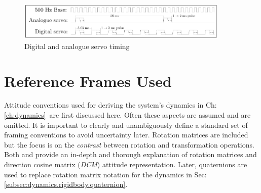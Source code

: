 \begin{figure}
\centering
\includegraphics[width=0.9\textwidth]{figs/servo-timing}
\caption{Digital and analogue servo timing}
\label{fig:servo-timing}
\vspace{-20pt}
\end{figure}
\section{Reference Frames Used}
\label{sec:proto.conventions}
Attitude conventions used for deriving the system's dynamics in Ch:\ref{ch:dynamics}~are first discussed here. Often these aspects are assumed and are omitted. It is important to clearly and unambiguously define a standard set of framing conventions to avoid uncertainty later. Rotation matrices are included but the focus is on the \emph{contrast} between rotation and transformation operations. Both \cite{spacecraftattitutdequaternions} and \cite{rigidbodylecture} provide an in-depth and thorough explanation of rotation matrices and direction cosine matrix (\emph{DCM}) attitude representation. Later, quaternions are used to replace rotation matrix notation for the dynamics in Sec:\ref{subsec:dynamics.rigidbody.quaternion}.
